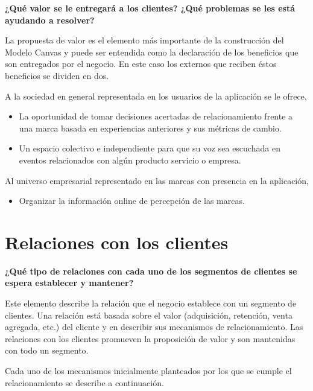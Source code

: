 \textbf{¿Qué valor se le entregará a los clientes? ¿Qué problemas se les está ayudando a resolver?}

La propuesta de valor es el elemento más importante de la construcción del Modelo Canvas y puede ser entendida como la declaración de los beneficios que son entregados por el negocio. En este caso los externos que reciben éstos beneficios se dividen en dos. 

A la sociedad en general representada en los usuarios de la aplicación se le ofrece,
\begin{itemize}
    \item La oportunidad de tomar decisiones acertadas de relacionamiento frente a una marca basada en experiencias anteriores y sus métricas de cambio.
    \item Un espacio colectivo e independiente para que su voz sea escuchada en eventos relacionados con algún producto servicio o empresa.
\end{itemize}   

Al universo empresarial representado en las marcas con presencia en la aplicación, 
\begin{itemize}
    \item Organizar la información online de percepción de las marcas.
\end{itemize}

\section{Relaciones con los clientes}

\textbf{¿Qué tipo de relaciones con cada uno de los segmentos de clientes se espera establecer y mantener?}

Este elemento describe la relación que el negocio establece con un segmento de clientes. Una relación está basada sobre el valor (adquisición, retención, venta agregada, etc.) del cliente y en describir sus mecanismos de relacionamiento. Las relaciones con los clientes promueven la proposición de valor y son mantenidas con todo un segmento.

Cada uno de los mecanismos inicialmente planteados por los que se cumple el relacionamiento se describe a continuación.

